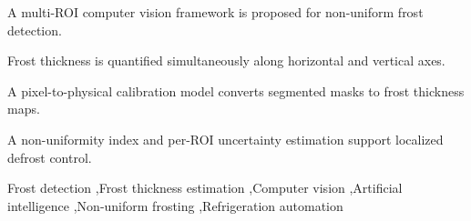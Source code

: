 \documentclass[a4paper,fleqn]{cas-dc}
\begin{document}
\begin{abstract}
Frost accumulation on the evaporator coils of refrigeration systems severely degrades thermal performance, restricting airflow and significantly driving up power consumption. Traditional frost detection paradigms often simplify this issue by treating accumulation as a completely uniform layer or by relying on localized physical point sensors, thereby failing to capture the complex spatial variations across the coil geometry. To address this limitation, this paper presents a novel artificial intelligence-driven computer vision framework designed to detect and quantify non-uniform frost development. By establishing a comprehensive matrix of Regions of Interest (ROIs) across the entire surface of the evaporator coil, the proposed approach facilitates full-field spatial tracking. Utilizing tailored digital image processing and deep learning architectures, our system successfully quantifies frost thickness non-uniformity across both the horizontal and vertical spatial directions simultaneously. Experimental validation carried out on a domestic refrigeration platform demonstrates that this multi-ROI spatial profiling provides high-fidelity localized thickness mapping, offering a robust, data-driven foundation for next-generation, on-demand intelligent defrosting strategies.
\end{abstract}

\begin{highlights}
\item A multi-ROI computer vision framework is proposed for non-uniform frost detection.
\item Frost thickness is quantified simultaneously along horizontal and vertical axes.
\item A pixel-to-physical calibration model converts segmented masks to frost thickness maps.
\item A non-uniformity index and per-ROI uncertainty estimation support localized defrost control.
\end{highlights}

\begin{keywords}
Frost detection \sep Frost thickness estimation \sep Computer vision \sep Artificial intelligence \sep Non-uniform frosting \sep Refrigeration automation
\end{keywords}

\maketitle
\end{document}
